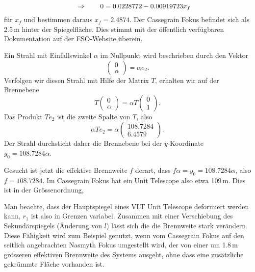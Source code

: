 \begin{loesung}
\begin{teilaufgaben}
\[\qquad\Rightarrow\qquad
0=
 0.0228772 - 0.00919723 x_f\\
\]
für $x_f$ und bestimmen daraus $x_f=2.4874$.
Der Cassegrain Fokus befindet sich als 2.5\,m hinter der Spiegelfläche.
Dies stimmt mit der öffentlich verfügbaren Dokumentation auf der ESO-Website
überein.
\item
Ein Strahl mit Einfallswinkel $\alpha$ im Nullpunkt wird beschrieben
durch den Vektor
\[
\begin{pmatrix}0\\\alpha\end{pmatrix}
=
\alpha e_2
.
\]
Verfolgen wir diesen Strahl mit Hilfe der Matrix $T$, erhalten wir auf
der Brennebene
\[
T\begin{pmatrix}0\\\alpha\end{pmatrix}
=
\alpha T\begin{pmatrix}0\\1\end{pmatrix}.
\]
Das Produkt $Te_2$ ist die zweite Spalte von $T$, also
\[
\alpha Te_2
=
\alpha
\left(
\begin{array}{r}
108.7284\\
  6.4579
\end{array}\right).
\]
Der Strahl durchsticht daher die Brennebene bei der $y$-Koordinate
$y_0=108.7284\alpha$.
\item
Gesucht ist jetzt die effektive Brennweite $f$ derart, dass 
$f\alpha=y_0= 108.7284\alpha$, also $f=108.7284$.
Im Cassegrain Fokus hat ein Unit Telescope also etwa 109\,m. 
Dies ist in der Grössenordnung, 
\qedhere
\end{teilaufgaben}
\end{loesung}

\begin{diskussion}
Man beachte, dass der Hauptspiegel eines VLT Unit Telescope deformiert
werden kann, $r_1$ ist also in Grenzen variabel.
Zusammen mit einer Verschiebung des Sekundärspiegels (Änderung von $l$)
lässt sich die die Brennweite stark verändern.
Diese Fähigkeit wird zum Beispiel genutzt, wenn vom Cassegrain Fokus
auf den seitlich angebrachten Nasmyth Fokus umgestellt wird, der
von einer um 1.8\,m grösseren effektiven Brennweite des Systems ausgeht,
ohne dass eine zusätzliche gekrümmte Fläche vorhanden ist.
\end{diskussion}
\egroup


